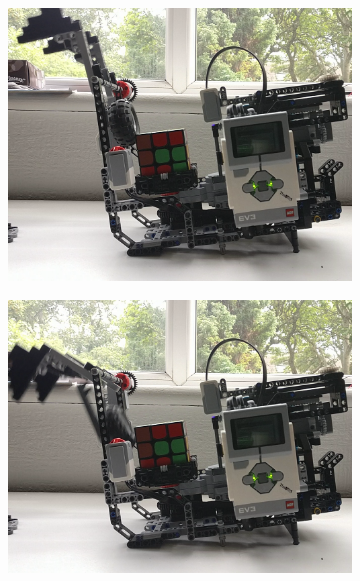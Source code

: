 \documentclass{report}
\begin{document}
	\begin{figure}[H]
		\centering
		\begin{subfigure}[b]{0.25\textwidth}
			\includegraphics[width=\textwidth]{Resources/Images/mkIArmCollapse1.png}
		\end{subfigure}
		\hspace{5mm}
		\begin{subfigure}[b]{0.25\textwidth}
			\includegraphics[width=\textwidth]{Resources/Images/mkIArmCollapse2.png}
		\end{subfigure}
		\hspace{5mm}
		\begin{subfigure}[b]{0.25\textwidth}

\end{subfigure}
\end{figure}
\end{document}
